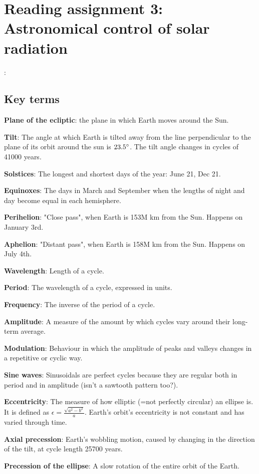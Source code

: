 \section{Reading assignment 3: Astronomical control of solar radiation}:

\subsection{Key terms}

\textbf{Plane of the ecliptic}: the plane in which Earth moves around the Sun.

\textbf{Tilt}: The angle at which Earth is tilted away from the line
perpendicular to the plane of its orbit around the sun is $23.5 \degree$. The
tilt angle changes in cycles of 41000 years.

\textbf{Solstices}: The longest and shortest days of the year: June 21, Dec 21.

\textbf{Equinoxes}: The days in March and September when the lengths of night
and day become equal in each hemisphere.

\textbf{Perihelion}: "Close pass", when Earth is 153M km from the Sun. Happens
on January 3rd.

\textbf{Aphelion}: "Distant pass", when Earth is 158M km from the Sun. Happens
on July 4th.

\textbf{Wavelength}: Length of a cycle.

\textbf{Period}: The wavelength of a cycle, expressed in units.

\textbf{Frequency}: The inverse of the period of a cycle.

\textbf{Amplitude}: A measure of the amount by which cycles vary around their
long-term average.

\textbf{Modulation}: Behaviour in which the amplitude of peaks and valleys
changes in a repetitive or cyclic way.

\textbf{Sine waves}: Sinusoidals are perfect cycles because they are regular
both in period and in amplitude (isn't a sawtooth pattern too?).

\textbf{Eccentricity}: The measure of how elliptic (=not perfectly circular)
an ellipse is. It is defined as $\epsilon = \frac{\sqrt{a^2 - b^2}}{a}$.
Earth's orbit's eccentricity is not constant and has varied through time.

\textbf{Axial precession}: Earth's wobbling motion, caused by changing in the
direction of the tilt, at cycle length 25700 years.

\textbf{Precession of the ellipse}: A slow rotation of the entire orbit of the
Earth.

